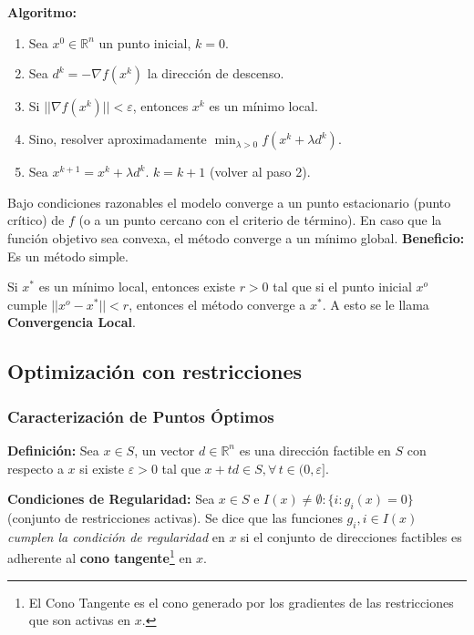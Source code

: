 \documentclass{article}
\begin{document}
\textbf{Algoritmo:}

\begin{enumerate}
    \item Sea $x^0 \in \mathbb{R}^n$ un punto inicial, $k=0$.
    \item Sea $d^k = -\nabla f(x^k)$ la dirección de descenso.
    \item Si $||\nabla f(x^k)|| < \varepsilon$, entonces $x^k$ es un mínimo local.
    \item Sino, resolver aproximadamente $\min_{\lambda>0} f(x^k + \lambda d^k)$.
    \item Sea $x^{k+1}=x^k + \lambda d^k$. $k = k+1$ (volver al paso 2).
\end{enumerate}

Bajo condiciones razonables el modelo converge a un punto estacionario (punto crítico) de $f$ (o a un punto cercano con el criterio de término). En caso que la función objetivo sea convexa, el método converge a un mínimo global. \textbf{Beneficio:} Es un método simple.

Si $x^*$ es un mínimo local, entonces existe $r>0$ tal que si el punto inicial $x^o$ cumple $||x^o - x^*|| < r$, entonces el método converge a $x^*$. A esto se le llama \textbf{Convergencia Local}.

\subsection{Optimizaci\'on con restricciones}

\subsubsection{Caracterización de Puntos Óptimos}

\textbf{Definición:} Sea $x \in S$, un vector $d \in \mathbb{R}^n$ es una dirección factible en $S$ con respecto a $x$ si existe $\varepsilon > 0$ tal que $x + td \in S, \forall \, t \in (0, \varepsilon]$.

\vspace*{0.5cm}

\textbf{Condiciones de Regularidad:} Sea $x \in S$ e $I(x) \neq \emptyset: \{i:g_i(x) = 0\}$ (conjunto de restricciones activas). Se dice que las funciones $g_i, i \in I(x)$ \textit{cumplen la condición de regularidad} en $x$ si el conjunto de direcciones factibles es adherente al \textbf{cono tangente}\footnote{El Cono Tangente es el cono generado por los gradientes de las restricciones que son activas en $x$.} en $x$.
\end{document}
